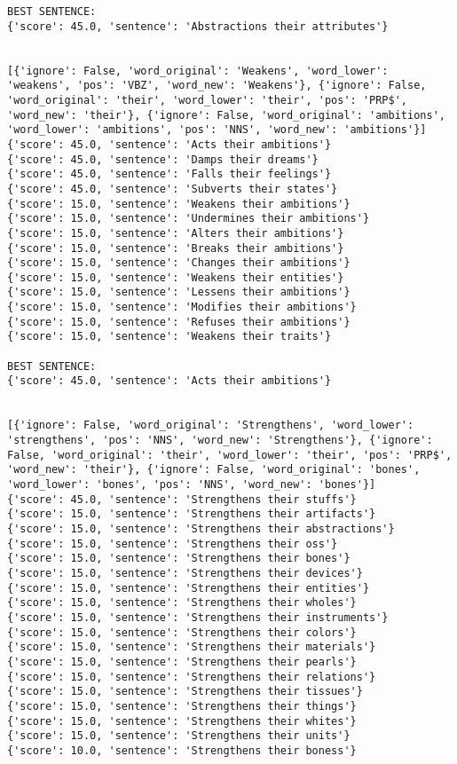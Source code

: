\documentclass[12pt,a4paper,oneside]{book}
\begin{document}
\begin{verbatim}
BEST SENTENCE:
{'score': 45.0, 'sentence': 'Abstractions their attributes'}


[{'ignore': False, 'word_original': 'Weakens', 'word_lower': 'weakens', 'pos': 'VBZ', 'word_new': 'Weakens'}, {'ignore': False, 'word_original': 'their', 'word_lower': 'their', 'pos': 'PRP$', 'word_new': 'their'}, {'ignore': False, 'word_original': 'ambitions', 'word_lower': 'ambitions', 'pos': 'NNS', 'word_new': 'ambitions'}]
{'score': 45.0, 'sentence': 'Acts their ambitions'}
{'score': 45.0, 'sentence': 'Damps their dreams'}
{'score': 45.0, 'sentence': 'Falls their feelings'}
{'score': 45.0, 'sentence': 'Subverts their states'}
{'score': 15.0, 'sentence': 'Weakens their ambitions'}
{'score': 15.0, 'sentence': 'Undermines their ambitions'}
{'score': 15.0, 'sentence': 'Alters their ambitions'}
{'score': 15.0, 'sentence': 'Breaks their ambitions'}
{'score': 15.0, 'sentence': 'Changes their ambitions'}
{'score': 15.0, 'sentence': 'Weakens their entities'}
{'score': 15.0, 'sentence': 'Lessens their ambitions'}
{'score': 15.0, 'sentence': 'Modifies their ambitions'}
{'score': 15.0, 'sentence': 'Refuses their ambitions'}
{'score': 15.0, 'sentence': 'Weakens their traits'}

BEST SENTENCE:
{'score': 45.0, 'sentence': 'Acts their ambitions'}


[{'ignore': False, 'word_original': 'Strengthens', 'word_lower': 'strengthens', 'pos': 'NNS', 'word_new': 'Strengthens'}, {'ignore': False, 'word_original': 'their', 'word_lower': 'their', 'pos': 'PRP$', 'word_new': 'their'}, {'ignore': False, 'word_original': 'bones', 'word_lower': 'bones', 'pos': 'NNS', 'word_new': 'bones'}]
{'score': 45.0, 'sentence': 'Strengthens their stuffs'}
{'score': 15.0, 'sentence': 'Strengthens their artifacts'}
{'score': 15.0, 'sentence': 'Strengthens their abstractions'}
{'score': 15.0, 'sentence': 'Strengthens their oss'}
{'score': 15.0, 'sentence': 'Strengthens their bones'}
{'score': 15.0, 'sentence': 'Strengthens their devices'}
{'score': 15.0, 'sentence': 'Strengthens their entities'}
{'score': 15.0, 'sentence': 'Strengthens their wholes'}
{'score': 15.0, 'sentence': 'Strengthens their instruments'}
{'score': 15.0, 'sentence': 'Strengthens their colors'}
{'score': 15.0, 'sentence': 'Strengthens their materials'}
{'score': 15.0, 'sentence': 'Strengthens their pearls'}
{'score': 15.0, 'sentence': 'Strengthens their relations'}
{'score': 15.0, 'sentence': 'Strengthens their tissues'}
{'score': 15.0, 'sentence': 'Strengthens their things'}
{'score': 15.0, 'sentence': 'Strengthens their whites'}
{'score': 15.0, 'sentence': 'Strengthens their units'}
{'score': 10.0, 'sentence': 'Strengthens their boness'}


\end{verbatim}
\end{document}

